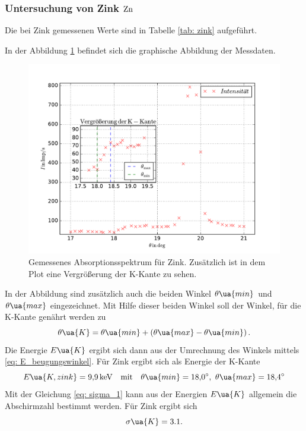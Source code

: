 \subsubsection{Untersuchung von Zink $\ce{Zn}$}\label{sec: zink}
Die bei Zink gemessenen Werte sind in Tabelle \ref{tab: zink} aufgeführt.

In der Abbildung \ref{fig: absotp_zink} befindet sich die graphische Abbildung der Messdaten.
\begin{figure}
  \centering
  \includegraphics[width=1\textwidth]{../Messdaten/zink.pdf}
  \caption{Gemessenes Absorptionsspektrum für Zink. Zusätzlich ist in dem Plot eine Vergrößerung der K-Kante zu sehen.} %
  \label{fig: absotp_zink}
\end{figure}
In der Abbildung sind zusätzlich auch die beiden Winkel $\theta\ua{min}$ und $\theta\ua{max}$
eingezeichnet. Mit Hilfe dieser beiden Winkel soll der Winkel, für die K-Kante genährt werden zu
\begin{equation}
  \label{eq:theta_k}
  \theta\ua{K}=\theta\ua{min}+\left(\theta\ua{max}-\theta\ua{min}\right).
\end{equation}
Die Energie $E\ua{K}$ ergibt sich dann aus der Umrechnung des Winkels mittels \eqref{eq: E_beugungswinkel}.
Für Zink ergibt sich als Energie der K-Kante
\begin{equation*}
  E\ua{K,zink}=\SI{9.9}{\kilo\eV} \quad \text{mit}\quad \theta\ua{min}=\SI{18.0}{\degree},\, \,   \theta\ua{max}=\SI{18.4}{\degree}
\end{equation*}
Mit der Gleichung \eqref{eq: sigma_1} kann aus der Energien $E\ua{K}$ allgemein die Abschirmzahl
bestimmt werden.
Für Zink ergibt sich
\begin{equation}
  \label{eq: abschirm_zink}
  \sigma\ua{K}=3.1.
\end{equation}
\FloatBarrier
\FloatBarrier
